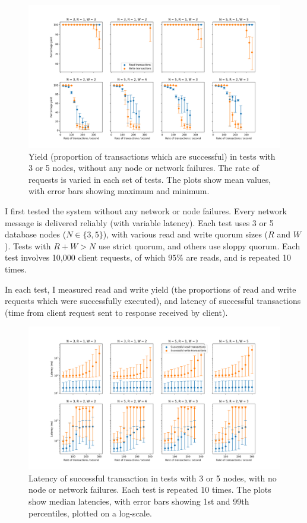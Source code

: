 \documentclass[12pt,a4paper,twoside,openany]{report}
\begin{document}
\begin{figure}[ht!]
\centerline{\includegraphics[width=\paperwidth]{figs/eval-fig-1.png}}
\caption[Yield in basic tests with 3 and 5 database nodes, using strict and sloppy quorum]{Yield (proportion of transactions which are successful) in tests with 3 or 5 nodes, without any node or network failures. The rate of requests is varied in each set of tests. The plots show mean values, with error bars showing maximum and minimum.}
\label{yield35nofail}
\end{figure}

I first tested the system without any network or node failures. Every network message is delivered reliably (with variable latency). Each test uses 3 or 5 database nodes ($N \in \{3, 5\}$), with various read and write quorum sizes ($R$ and $W$). Tests with $R + W > N$ use strict quorum, and others use sloppy quorum. Each test involves 10,000 client requests, of which $95\%$ are reads, and is repeated 10 times.

In each test, I measured read and write yield (the proportions of read and write requests which were successfully executed), and latency of successful transactions (time from client request sent to response received by client).

\begin{figure}[ht]
\centerline{\includegraphics[width=\paperwidth]{figs/eval-fig-5.png}}
\caption{Latency of successful transaction in tests with 3 or 5 nodes, with no node or network failures. Each test is repeated 10 times. The plots show median latencies, with error bars showing 1st and 99th percentiles, plotted on a log-scale.}
\label{latency35nofail}
\end{figure}
\end{document}
